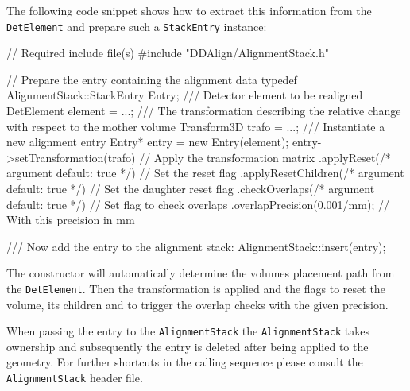 \documentclass[10pt,a4paper]{article}
\begin{document}
\noindent
The following code snippet shows how to extract this information from the
{\tt DetElement} and prepare such a {\tt StackEntry} instance:
\begin{code}
// Required include file(s)
#include "DDAlign/AlignmentStack.h"

    // Prepare the entry containing the alignment data
    typedef AlignmentStack::StackEntry Entry;
    /// Detector element to be realigned
    DetElement element = ...;
    /// The transformation describing the relative change with respect to the mother volume
    Transform3D trafo = ...;
    /// Instantiate a new alignment entry
    Entry* entry = new Entry(element);
    entry->setTransformation(trafo)                         // Apply the transformation matrix
        .applyReset(/* argument default: true */)           // Set the reset flag
        .applyResetChildren(/* argument default: true */)   // Set the daughter reset flag
        .checkOverlaps(/* argument default: true */)        // Set flag to check overlaps
        .overlapPrecision(0.001/mm);                        // With this precision in mm

    /// Now add the entry to the alignment stack:
    AlignmentStack::insert(entry);
\end{code}
The constructor will automatically determine the volumes placement path
from the {\tt DetElement}. Then the transformation is applied and the flags
to reset the volume, its children and to trigger the overlap checks with 
the given precision.

\noindent
When passing the entry to the {\tt AlignmentStack} the {\tt AlignmentStack}
takes ownership and subsequently the entry is deleted after being applied to
the geometry. For further shortcuts in the calling sequence please consult the
{\tt AlignmentStack} header file.


\noindent
\end{document}
